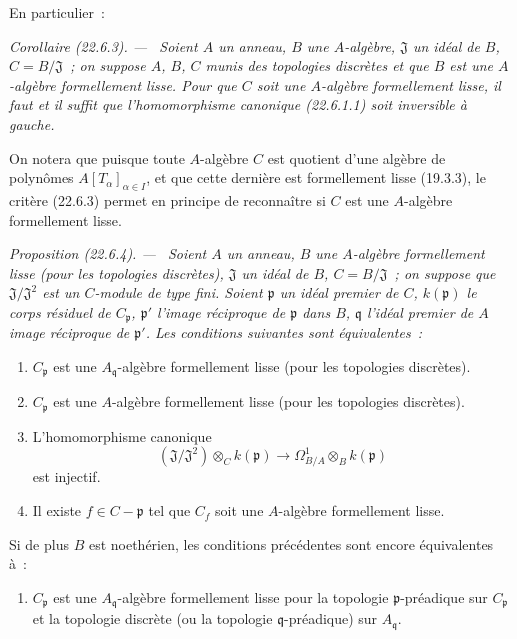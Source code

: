 \documentclass[10pt,oneside]{book}
\makeatletter
\newcommand{\setmanualcurrentlabel}[1]{\def\@currentlabel{#1}}
\newenvironment{proposition}[1][]{%
  \setmanualcurrentlabel{#1}\par\medskip\noindent\itshape Proposition (#1). ---\ }{\par}
\newenvironment{corollary}[1][]{%
  \setmanualcurrentlabel{#1}\par\medskip\noindent\itshape Corollaire (#1). ---\ }{\par}
\makeatother
\begin{document}
En particulier~:

\begin{corollary}[22.6.3]
\label{0.22.6.3-fr}
Soient $A$ un anneau, $B$ une $A$-algèbre, $\mathfrak J$ un idéal de $B$,
$C=B/\mathfrak J$~; on suppose $A$, $B$, $C$ munis des topologies discrètes
et que $B$ est une $A$-algèbre formellement lisse. Pour que $C$ soit une
$A$-algèbre formellement lisse, il faut et il suffit que l'homomorphisme
canonique (22.6.1.1) soit inversible à gauche.
\end{corollary}

On notera que puisque toute $A$-algèbre $C$ est quotient d'une algèbre de
polynômes $A[T_\alpha]_{\alpha\in I}$, et que cette dernière est formellement
lisse (19.3.3), le critère (22.6.3) permet en principe de reconnaître si $C$
est une $A$-algèbre formellement lisse.

\begin{proposition}[22.6.4]
\label{0.22.6.4-fr}
Soient $A$ un anneau, $B$ une $A$-algèbre formellement lisse (pour les
topologies discrètes), $\mathfrak J$ un idéal de $B$, $C=B/\mathfrak J$~; on
suppose que $\mathfrak J/\mathfrak J^2$ est un $C$-module de type fini. Soient
$\mathfrak p$ un idéal premier de $C$, $k(\mathfrak p)$ le corps résiduel de
$C_{\mathfrak p}$, $\mathfrak p'$ l'image réciproque de $\mathfrak p$ dans
$B$, $\mathfrak q$ l'idéal premier de $A$ image réciproque de $\mathfrak p'$.
Les conditions suivantes sont équivalentes~:
\begin{enumerate}
  \item[a)] $C_{\mathfrak p}$ est une $A_{\mathfrak q}$-algèbre formellement
  lisse (pour les topologies discrètes).
  \item[a')] $C_{\mathfrak p}$ est une $A$-algèbre formellement lisse (pour
  les topologies discrètes).
  \item[b)] L'homomorphisme canonique
  \begin{equation}
  \label{0.22.6.4.1-fr}
    (\mathfrak J/\mathfrak J^2)\otimes_Ck(\mathfrak p)
    \longrightarrow\Omega^1_{B/A}\otimes_Bk(\mathfrak p)
    \tag{22.6.4.1}
  \end{equation}
  est injectif.
  \item[c)] Il existe $f\in C-\mathfrak p$ tel que $C_f$ soit une
  $A$-algèbre formellement lisse.
\end{enumerate}
Si de plus $B$ est noethérien, les conditions précédentes sont encore
équivalentes à~:
\begin{enumerate}
  \item[d)] $C_{\mathfrak p}$ est une $A_{\mathfrak q}$-algèbre formellement
  lisse pour la topologie $\mathfrak p$-préadique sur $C_{\mathfrak p}$ et la
  topologie discrète (ou la topologie $\mathfrak q$-préadique) sur
  $A_{\mathfrak q}$.
\end{enumerate}
\end{proposition}
\end{document}

